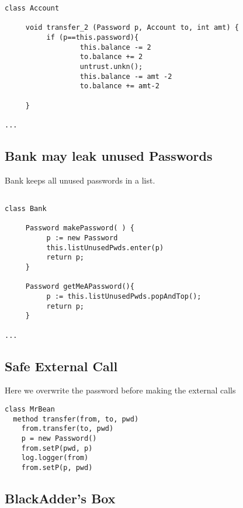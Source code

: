 \begin{lstlisting}[language=chainmail, mathescape=true, frame=lines]
class Account

     void transfer_2 (Password p, Account to, int amt) {
          if (p==this.password){
                  this.balance -= 2
                  to.balance += 2
                  untrust.unkn();
                  this.balance -= amt -2
                  to.balance += amt-2
                     
     }
     
...
\end{lstlisting}

\subsection{Bank may leak unused Passwords}
\label{s:deactivate_leak_old}

Bank keeps all unused passwords in a list. 

\begin{lstlisting}[language=chainmail, mathescape=true, frame=lines]

class Bank

     Password makePassword( ) {
          p := new Password
          this.listUnusedPwds.enter(p) 
          return p;                    
     }
     
     Password getMeAPassword(){
          p := this.listUnusedPwds.popAndTop();
          return p;
     }
     
...
\end{lstlisting}

\subsection{Safe External Call}
\label{s:safe:extern}

Here we overwrite the password before making the external calls

\begin{lstlisting}[language=chainmail, mathescape=true, frame=lines]
class MrBean
  method transfer(from, to, pwd)
    from.transfer(to, pwd)
    p = new Password()
    from.setP(pwd, p)
    log.logger(from)
    from.setP(p, pwd)
\end{lstlisting}


\subsection{BlackAdder's Box}
\label{s:blackadder_box}


